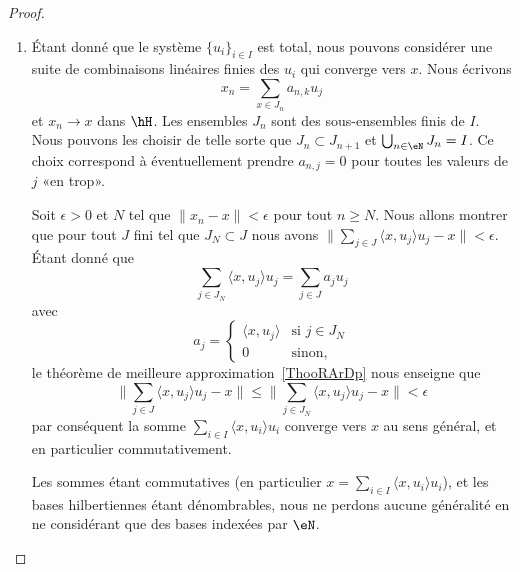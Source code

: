 \begin{proof}
	\begin{enumerate}
		\item
		      Étant donné que le système \( \{ u_i \}_{i\in I}\) est total, nous pouvons considérer une suite de combinaisons linéaires finies des \( u_i\) qui converge vers \( x\). Nous écrivons
		      \begin{equation}
			      x_n=\sum_{x\in J_n}a_{n,k}u_j
		      \end{equation}
		      et \( x_n\to x\) dans \( \hH\). Les ensembles \( J_n\) sont des sous-ensembles finis de \( I\). Nous pouvons les choisir de telle sorte que \( J_n\subset J_{n+1}\) et \( \bigcup_{n\in \eN}J_n=I\). Ce choix correspond à éventuellement prendre \( a_{n,j}=0\) pour toutes les valeurs de \( j\) «en trop».

		      Soit \( \epsilon>0\) et \( N\) tel que \( \| x_n-x \|<\epsilon\) pour tout \( n\geq N\). Nous allons montrer que pour tout \( J\) fini tel que \( J_N\subset J\) nous avons \( \| \sum_{j\in J}\langle x, u_j\rangle u_j-x \|<\epsilon\). Étant donné que
		      \begin{equation}
			      \sum_{j\in J_N}\langle x, u_j\rangle u_j=\sum_{j\in J}a_ju_j
		      \end{equation}
		      avec
		      \begin{equation}
			      a_j=\begin{cases}
				      \langle x, u_j\rangle & \text{si } j\in J_N \\
				      0                     & \text{sinon},
			      \end{cases}
		      \end{equation}
		      le théorème de meilleure approximation~\ref{ThooRArDp} nous enseigne que
		      \begin{equation}
			      \| \sum_{j\in J}\langle x, u_j\rangle u_j-x \|\leq\| \sum_{j\in J_N}\langle x, u_j\rangle u_j-x \|<\epsilon
		      \end{equation}
		      par conséquent la somme \( \sum_{i\in I}\langle x, u_i\rangle u_i\) converge vers \( x\) au sens général, et en particulier commutativement.

		      Les sommes étant commutatives (en particulier \( x=\sum_{i\in I}\langle x, u_i\rangle u_i\)), et les bases hilbertiennes étant dénombrables, nous ne perdons aucune généralité en ne considérant que des bases indexées par \( \eN\).


\end{enumerate}
\end{proof}
